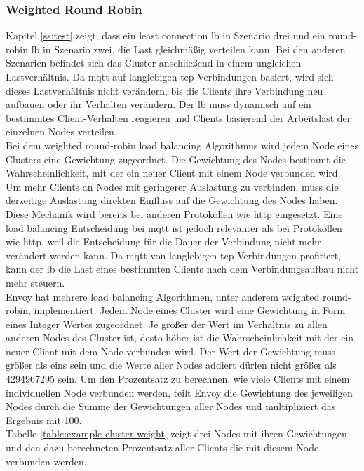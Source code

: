 \subsubsection{Weighted Round Robin} \label{ss:weighted-rr}
Kapitel \ref{ss:test} zeigt, dass ein least connection \acl{lb} in Szenario drei und ein round-robin \ac{lb} in Szenario zwei, die Last gleichmä{\ss}ig verteilen kann. Bei den anderen Szenarien befindet sich das Cluster anschlie{\ss}end in einem ungleichen Lastverhältnis. Da \ac{mqtt} auf langlebigen \ac{tcp} Verbindungen basiert, wird sich dieses Lastverhältnis nicht verändern, bis die Clients ihre Verbindung neu aufbauen oder ihr Verhalten verändern.
Der \ac{lb} muss dynamisch auf ein bestimmtes Client-Verhalten reagieren und Clients basierend der Arbeitslast der einzelnen Nodes verteilen.
\\
Bei dem weighted round-robin load balancing Algorithmus wird jedem Node eines Clusters eine Gewichtung zugeordnet. Die Gewichtung des Nodes bestimmt die Wahrscheinlichkeit, mit der ein neuer Client mit einem Node verbunden wird.
Um mehr Clients an Nodes mit geringerer Auslastung zu verbinden, muss die derzeitige Auslastung direkten Einfluss auf die Gewichtung des Nodes haben.
Diese Mechanik wird bereits bei anderen Protokollen wie \ac{http} eingesetzt.
Eine load balancing Entscheidung bei \ac{mqtt} ist jedoch relevanter als bei Protokollen wie \ac{http}, weil die Entscheidung für die Dauer der Verbindung nicht mehr verändert werden kann. Da \ac{mqtt} von langlebigen \ac{tcp} Verbindungen profitiert, kann der \ac{lb} die Last eines bestimmten Clients nach dem Verbindungsaufbau nicht mehr steuern.
\\
Envoy hat mehrere load balancing Algorithmen, unter anderem weighted round-robin, implementiert. Jedem Node eines Cluster wird eine Gewichtung in Form eines Integer Wertes zugeordnet. Je grö{\ss}er der Wert im Verhältnis zu allen anderen Nodes des Cluster ist, desto höher ist die Wahrscheinlichkeit mit der ein neuer Client mit dem Node verbunden wird. Der Wert der Gewichtung muss grö{\ss}er als eins sein und die Werte aller Nodes addiert dürfen nicht grö{\ss}er als 4294967295 sein.
Um den Prozentsatz zu berechnen, wie viele Clients mit einem individuellen Node verbunden werden, teilt Envoy die Gewichtung des jeweiligen Nodes durch die Summe der Gewichtungen aller Nodes und multipliziert das Ergebnis mit 100.
\cite{SupportedLoadBalancers}
\\
Tabelle \ref{table:example-cluster-weight} zeigt drei Nodes mit ihren Gewichtungen und den dazu berechneten Prozentsatz aller Clients die mit diesem Node verbunden werden.
